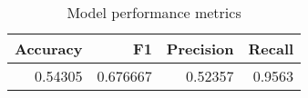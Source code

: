 \begin{table}
\centering
\caption{Model performance metrics}
\label{vgg10-transfer-fail}
\begin{tabular}{rrrr}
\toprule
 Accuracy &        F1 &  Precision &  Recall \\
\midrule
  0.54305 &  0.676667 &    0.52357 &  0.9563 \\
\bottomrule
\end{tabular}
\end{table}

